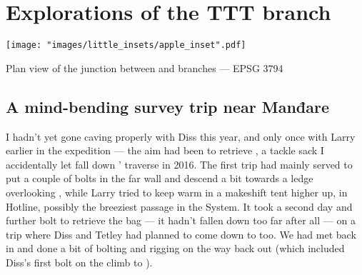 \section{Explorations of the TTT branch}

\begin{marginfigure}
\end{marginfigure}

\begin{marginsurvey}
	\texttt{[image: "images/little\_insets/apple\_inset".pdf]}
	\caption{Plan view of the \protect{} junction between \protect{} and \protect{} branches --- EPSG 3794}
\end{marginsurvey}

\subsection{A mind-bending survey trip near Manđare}
	I hadn't yet gone caving properly with Diss this year, and only once with Larry earlier in the expedition --- the aim had been to retrieve , a tackle sack I accidentally let fall down ' traverse in 2016. The first trip had mainly served to put a couple of bolts in the far wall and descend a bit towards a ledge overlooking , while Larry tried to keep warm in a makeshift tent higher up, in Hotline, possibly the breeziest passage in the System. It took a second day and further bolt to retrieve the bag --- it hadn't fallen down too far after all --- on a trip where Diss and Tetley had planned to come down to  too. We had met back in  and done a bit of bolting and rigging on the way back out (which included Diss's first bolt on the climb to ).
	
